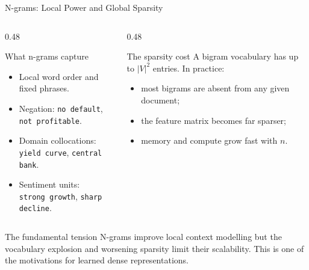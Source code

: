 \documentclass[aspectratio=169]{beamer}
\begin{document}
\begin{frame}{N-grams: Local Power and Global Sparsity}
\begin{columns}[T]
\begin{column}{0.48\textwidth}
\begin{block}{What n-grams capture}
\begin{itemize}
    \item Local word order and fixed phrases.
    \item Negation: \texttt{no default}, \texttt{not profitable}.
    \item Domain collocations:\\ \texttt{yield curve}, \texttt{central bank}.
    \item Sentiment units:\\ \texttt{strong growth}, \texttt{sharp decline}.
\end{itemize}
\end{block}
\end{column}
\begin{column}{0.48\textwidth}
\begin{block}{The sparsity cost}
A bigram vocabulary has up to $|V|^2$ entries.
In practice:
\begin{itemize}
    \item most bigrams are absent from any given document;
    \item the feature matrix becomes far sparser;
    \item memory and compute grow fast with $n$.
\end{itemize}
\end{block}
\end{column}
\end{columns}
 
\vspace{0.18cm}
\begin{alertblock}{The fundamental tension}
N-grams improve local context modelling but the vocabulary explosion and worsening sparsity
limit their scalability. This is one of the motivations for learned dense representations.
\end{alertblock}
\end{frame}
%
%
\end{document}
